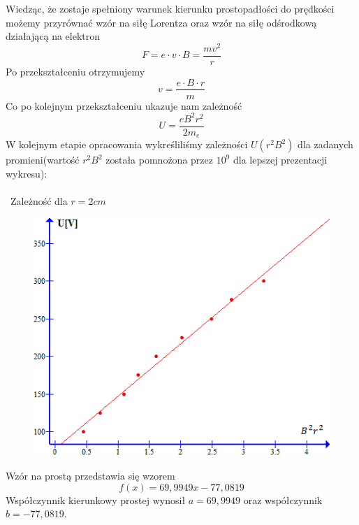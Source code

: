 \documentclass{article}
\begin{document}
Wiedząc, że zostaje spełniony warunek kierunku prostopadłości do prędkości możemy przyrównać wzór na siłę Lorentza oraz wzór na siłę odśrodkową działającą na elektron
$$F = e \cdot v \cdot B = \frac{mv^2}{r}$$
Po przekształceniu otrzymujemy 
$$v = \frac{ e \cdot B \cdot r}{m}$$
Co po kolejnym przekształceniu ukazuje nam zależność
$$ U = \frac{eB^2 r^2}{2m_e} $$
W kolejnym etapie opracowania wykreśliliśmy zależności $U(r^2 B^2)$ dla zadanych promieni(wartość $r^2B^2$ została pomnożona przez $10^{9}$ dla lepszej prezentacji wykresu):\\\\\
Zależność dla $r = 2cm$
\begin{figure}[H]
\centering
\includegraphics[width=13cm]{wykres1.png}
\end{figure}
Wzór na prostą przedstawia się wzorem
$$ f(x) = 69,9949x - 77,0819$$
Współczynnik kierunkowy prostej wynosił $a = 69,9949$ oraz współczynnik $b = -77,0819$.\\\\\\\\\\\\\\\\\\\\\\\\\\\\\\\\
\end{document}
